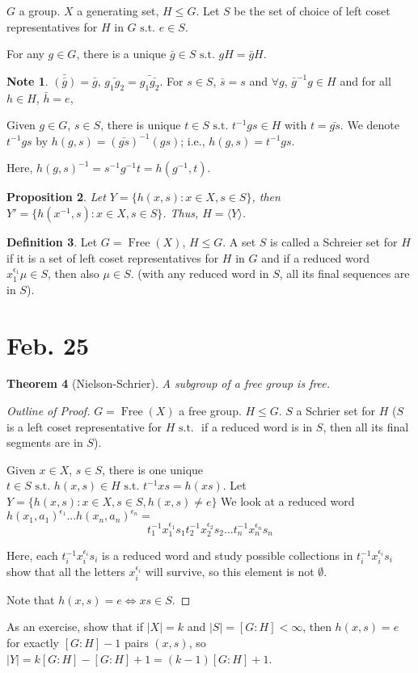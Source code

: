 \documentclass{amsart}
\newtheorem{thm}{Theorem}[section]
\newtheorem{prop}[thm]{Proposition}
\theoremstyle{definition}
\newtheorem{definition}[thm]{Definition}
\newtheorem{note}[thm]{Note}
\newcommand{\st}{\text{ s.t. }}
\DeclareMathOperator{\Free}{Free}
\begin{document}
$G$ a group. $X$ a generating set, $H\leq G$. Let $S$ be the set of choice of left coset representatives for $H$ in $G\st e\in S$.

For any $g\in G$, there is a unique $\bar g\in S\st gH=\bar gH$.

\begin{note}
	$\bar{(\bar{g})}=\bar g$, $\bar{g_1g_2}=\bar{g_1\bar{g_2}}$. For $s\in S$, $\bar s=s$ and $\forall g$, $\bar g^{-1}g\in H$ and for all $h\in H$, $\bar{h}=e$,

Given $g\in G$, $s\in S$, there is unique $t\in S\st t^{-1}gs\in H$ with $t=\bar{gs}$. We denote $t^{-1}gs$ by $h(g,s)=(\bar{gs})^{-1}(gs)$; i.e., $h(g,s)=t^{-1}gs$.

Here, $h(g,s)^{-1}=s^{-1}g^{-1}t=h(g^{-1},t)$.
\end{note}
\begin{prop}
	Let $Y=\{h(x,s):x\in X,s\in S\}$, then $Y'=\{h(x^{-1},s):x\in X,s\in S\}$. Thus, $H=\langle Y\rangle$.
\end{prop}
\begin{definition}
	Let $G=\Free(X)$, $H\leq G$. A set $S$ is called a Schreier set for $H$ if it is a set of left coset representatives for $H$ in $G$ and if a reduced word $x_1^{\epsilon_1}\mu\in S$, then also $\mu\in S$. (with any reduced word in $S$, all its final sequences are in $S$). 
\end{definition}
\section{Feb. 25}
\begin{thm}[Nielson-Schrier]
A subgroup of a free group is free.
\end{thm}
\begin{proof}[Outline of Proof]
	$G=\Free(X)$ a free group. $H\leq G$. $S$ a Schrier set for $H$ ($S$ is a left coset representative for $H\st$ if a reduced word is in $S$, then all its final segments are in $S$). 
	
	Given $x\in X$, $s\in S$, there is one unique $t\in S\st h(x,s)\in H\st t^{-1}xs=h(xs)$. Let $Y=\{h(x,s):x\in X,s\in S,h(x,s)\not=e\}$ We look at a reduced word $h(x_1,a_1)^{\epsilon_1}...h(x_n,a_n)^{\epsilon_n}=$
	$$t_1^{-1}x_1^{\epsilon_1}s_1t_2^{-1}x_2^{\epsilon_2}s_2...t_n^{-1}x_n^{\epsilon_n}s_n$$
	
	Here, each $t_i^{-1}x_i^{\epsilon_i}s_i$ is a reduced word and study possible collections in $t_i^{-1}x_i^{\epsilon_i}s_i$ show that all the letters $x_i^{\epsilon_i}$ will survive, so this element is not $\emptyset$.
	
	Note that $h(x,s)=e\iff xs\in S$.
\end{proof}
	As an exercise, show that if $|X|=k$ and $|S|=[G:H]<\infty$, then $h(x,s)=e$ for exactly $[G:H]-1$ pairs $(x,s)$, so $|Y|=k[G:H]-[G:H]+1=(k-1)[G:H]+1$.
\end{document}
